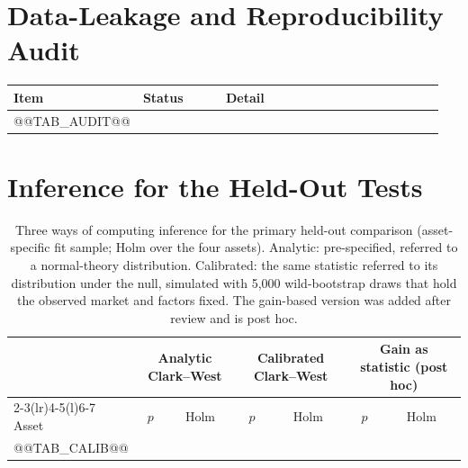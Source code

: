 \documentclass[11pt]{article}
\begin{document}
\appendix
\section{Data-Leakage and Reproducibility Audit}
\label{app:audit}

\small
\begin{longtable}{@{}p{0.2\linewidth}p{0.2\linewidth}p{0.55\linewidth}@{}}
\toprule
Item & Status & Detail \\
\midrule
\endhead
@@TAB_AUDIT@@
\bottomrule
\end{longtable}
\normalsize

\section{Inference for the Held-Out Tests}
\label{app:calib}

\begin{table}[h]
\centering\small
\begin{tabular}{@{}lcccccc@{}}
\toprule
 & \multicolumn{2}{c}{Analytic Clark--West} & \multicolumn{2}{c}{Calibrated Clark--West} & \multicolumn{2}{c}{Gain as statistic (post hoc)} \\
\cmidrule(lr){2-3}\cmidrule(lr){4-5}\cmidrule(l){6-7}
Asset & $p$ & Holm & $p$ & Holm & $p$ & Holm \\
\midrule
@@TAB_CALIB@@
\bottomrule
\end{tabular}
\caption{Three ways of computing inference for the primary held-out comparison (asset-specific fit sample; Holm over the four assets). Analytic: pre-specified, referred to a normal-theory distribution. Calibrated: the same statistic referred to its distribution under the null, simulated with 5{,}000 wild-bootstrap draws that hold the observed market and factors fixed. The gain-based version was added after review and is post hoc.}
\label{tab:calib}
\end{table}
\end{document}
